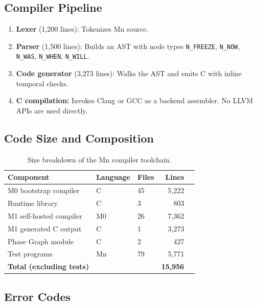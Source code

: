 \documentclass[11pt,a4paper]{article}
\begin{document}
\subsection{Compiler Pipeline}

\begin{enumerate}[leftmargin=*,itemsep=2pt]
  \item \textbf{Lexer} (1,200 lines): Tokenizes Mn source.
  \item \textbf{Parser} (1,500 lines): Builds an AST with node types \texttt{N\_FREEZE},
    \texttt{N\_NOW}, \texttt{N\_WAS}, \texttt{N\_WHEN}, \texttt{N\_WILL}.
  \item \textbf{Code generator} (3,273 lines): Walks the AST and emits C with inline temporal
    checks.
  \item \textbf{C compilation:} Invokes Clang or GCC as a backend assembler. No LLVM APIs are
    used directly.
\end{enumerate}

\subsection{Code Size and Composition}

\begin{table}[h]
\centering
\caption{Size breakdown of the Mn compiler toolchain.}
\label{tab:size}
\begin{tabular}{@{}lllrr@{}}
\toprule
\textbf{Component} & \textbf{Language} & \textbf{Files} & \textbf{Lines}\\
\midrule
M0 bootstrap compiler    & C  & 45 & 5,222\\
Runtime library          & C  &  3 &   803\\
M1 self-hosted compiler  & M0 & 26 & 7,362\\
M1 generated C output    & C  &  1 & 3,273\\
Phase Graph module       & C  &  2 &   427\\
Test programs            & Mn & 79 & 5,771\\
\midrule
\textbf{Total (excluding tests)} & & & \textbf{15,956}\\
\bottomrule
\end{tabular}
\end{table}

\subsection{Error Codes}
\end{document}
